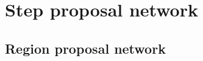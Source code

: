 \documentclass[9pt,t,aspectratio=1610]{beamer}
\begin{document}
\section{Step proposal network}


\subsection{Region proposal network}

\begin{frame}[noframenumbering]{\ }
\hfill
\parbox[t]{.85\textwidth}{
  \begin{minipage}[c][0.65\textheight]{\textwidth}
  \tableofcontents[currentsection, subsectionstyle=show/shaded/shaded]
  \end{minipage}
}
\end{frame}
\end{document}
